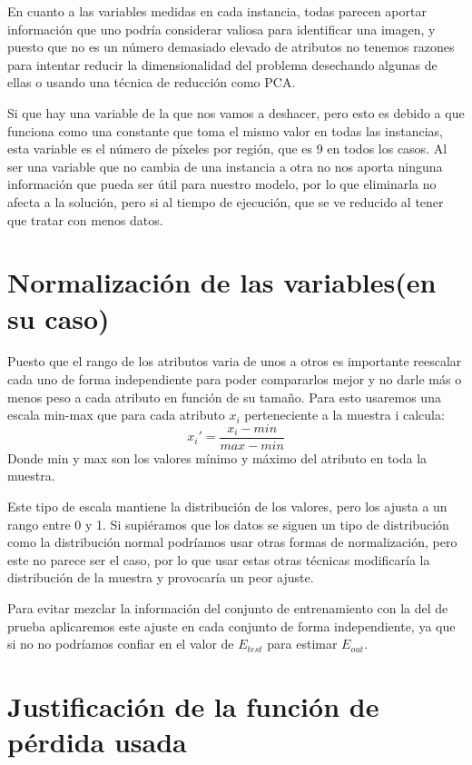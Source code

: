 \documentclass{article}
\begin{document}
	En cuanto a las variables medidas en cada instancia, todas parecen aportar información que uno podría considerar valiosa para identificar una imagen, y puesto que no es un número demasiado elevado de atributos no tenemos razones para intentar reducir la dimensionalidad del problema desechando algunas de ellas o usando una técnica de reducción como PCA.
	\par 
	Si que hay una variable de la que nos vamos a deshacer, pero esto es debido a que funciona como una constante que toma el mismo valor en todas las instancias, esta variable es el número de píxeles por región, que es 9 en todos los casos. Al ser una variable que no cambia de una instancia a otra no nos aporta ninguna información que pueda ser útil para nuestro modelo, por lo que eliminarla no afecta a la solución, pero si al tiempo de ejecución, que se ve reducido al tener que tratar con menos datos.
	
	\section{Normalización de las variables(en su caso)} %
	
	Puesto que el rango de los atributos varia de unos a otros es importante reescalar cada uno de forma independiente para poder compararlos mejor y no darle más o menos peso a cada atributo en función de su tamaño. Para esto usaremos una escala min-max que para cada atributo $x_i$ perteneciente a la muestra i calcula:
	\begin{equation}
	x_i' = \frac{x_i-min}{max-min}
	\end{equation}
	\indent Donde min y max son los valores mínimo y máximo del atributo en toda la muestra.
	\par 
	Este tipo de escala mantiene la distribución de los valores, pero los ajusta a un rango entre 0 y 1.  Si supiéramos que los datos se siguen un tipo de distribución como la distribución normal podríamos usar otras formas de normalización, pero este no parece ser el caso, por lo que usar estas otras técnicas modificaría la distribución de la muestra y provocaría un peor ajuste.
	\par 
	Para evitar mezclar la información del conjunto de entrenamiento con la del de prueba aplicaremos este ajuste en cada conjunto de forma independiente, ya que si no no podríamos confiar en el valor de $E_{test}$ para estimar $E_{out}$.
	
	\section{Justificación de la función de pérdida usada}
	
\end{document}
